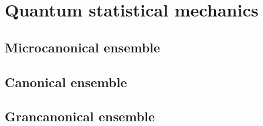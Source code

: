\part{Quantum statistical mechanics}

\chapter{Microcanonical ensemble}
\chapter{Canonical ensemble}
\chapter{Grancanonical ensemble}